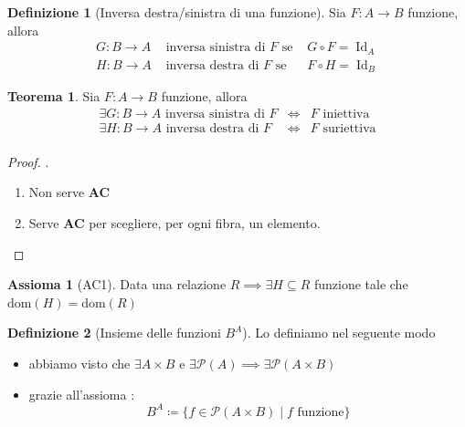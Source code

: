 \documentclass[a4paper,10pt]{article}
\theoremstyle{definition}
\DeclareMathOperator*{\Id}{Id}
\theoremstyle{indentdefinition}
\newtheorem{defn}{Definizione}[section]
\theoremstyle{indentpostulate}
\newtheorem{axiom}{Assioma}[section]
\theoremstyle{indenttheorem}
\newtheorem{thm}{Teorema}[section]
\theoremstyle{myremark}
\theoremstyle{indentgeneral}
\begin{document}
\begin{defn}[Inversa destra/sinistra di una funzione] Sia $F:A\to B$ funzione, allora
$$\begin{array}{lll}
    G:B\to A &\text{ inversa sinistra di $F$ se } & G\circ F=\Id_A \\
     H:B\to A &\text{ inversa destra di $F$ se } & F\circ H=\Id_B
\end{array}$$
\end{defn}

\begin{thm}
    Sia $F:A\to B$ funzione, allora
$$\begin{array}{lll}
    \exists G:B\to A \text{ inversa sinistra di $F$}& \iff & F\text{ iniettiva}\\
     \exists H:B\to A \text{ inversa destra di $F$}& \iff & F\text{ suriettiva}\\
\end{array}$$
\end{thm}

\begin{proof}.
\begin{enumerate}
    \item Non serve \textbf{AC}
    \item Serve \textbf{AC} per scegliere, per ogni fibra, un elemento.
\end{enumerate}
\end{proof}

\begin{axiom}[AC1]\label{axm-ac1}
    Data una relazione $R\implies\exists H\subseteq R$ funzione tale che $\text{dom}(H)=\text{dom}(R)$
\end{axiom}

\begin{defn}[Insieme delle funzioni $B^A$] Lo definiamo nel seguente modo
\begin{itemize}
    \item abbiamo visto che $\exists A\times B$ e $\exists\mathscr{P}(A)\implies\exists\mathscr{P}(A\times B)$
    \item grazie all'assioma :
    $$B^A\coloneqq\{f\in\mathscr{P}(A\times B)\mid f\text{ funzione}\}$$
\end{itemize}
\end{defn}
\end{document}
